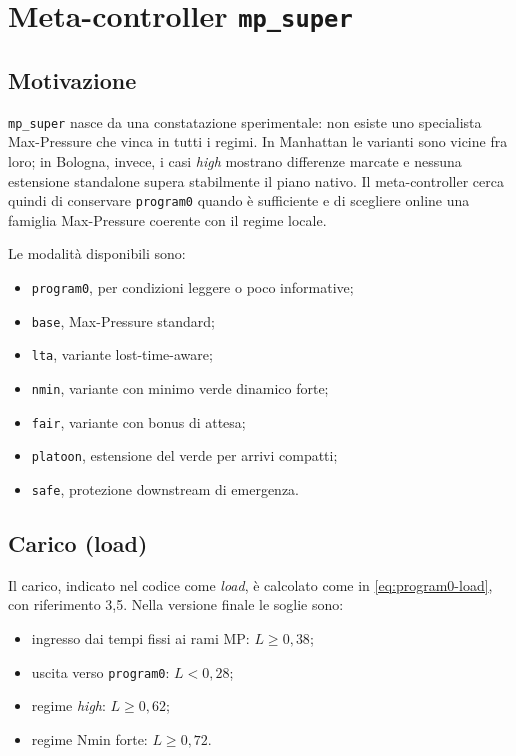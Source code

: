 \documentclass[12pt,a4paper,oneside]{report}
\numberwithin{equation}{chapter}
\begin{document}
\section{Meta-controller \texttt{mp\_super}}

\subsection{Motivazione}

\texttt{mp\_super} nasce da una constatazione sperimentale: non esiste uno
specialista Max-Pressure che vinca in tutti i regimi. In Manhattan le varianti
sono vicine fra loro; in Bologna, invece, i casi \emph{high} mostrano differenze
marcate e nessuna estensione standalone supera stabilmente il piano nativo. Il
meta-controller cerca quindi di conservare \texttt{program0} quando è
sufficiente e di scegliere online una famiglia Max-Pressure coerente con il
regime locale.

Le modalità disponibili sono:

\begin{itemize}
    \item \texttt{program0}, per condizioni leggere o poco informative;
    \item \texttt{base}, Max-Pressure standard;
    \item \texttt{lta}, variante lost-time-aware;
    \item \texttt{nmin}, variante con minimo verde dinamico forte;
    \item \texttt{fair}, variante con bonus di attesa;
    \item \texttt{platoon}, estensione del verde per arrivi compatti;
    \item \texttt{safe}, protezione downstream di emergenza.
\end{itemize}

\subsection{Carico (load)}

Il carico, indicato nel codice come \emph{load}, è calcolato come in
\cref{eq:program0-load}, con riferimento 3,5. Nella versione finale le soglie
sono:

\begin{itemize}
    \item ingresso dai tempi fissi ai rami MP: \(L\geq 0{,}38\);
    \item uscita verso \texttt{program0}: \(L<0{,}28\);
    \item regime \emph{high}: \(L\geq 0{,}62\);
    \item regime Nmin forte: \(L\geq 0{,}72\).
\end{itemize}
\end{document}
